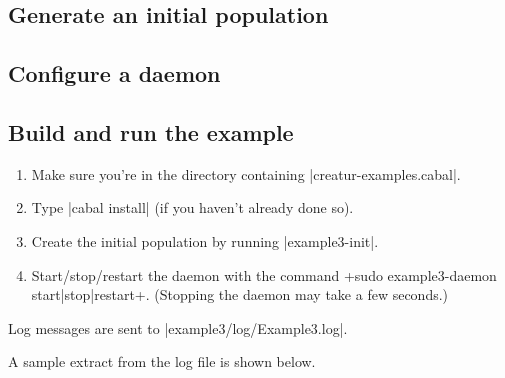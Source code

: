 \documentclass[a4paper,10pt]{report}
\begin{document}
\subsection{Generate an initial population}
\label{sec:pop3}



\subsection{Configure a daemon}
\label{sec:daemon3}



\subsection{Build and run the example}
\label{sec:run3}

\begin{enumerate}
\item Make sure you're in the directory containing |creatur-examples.cabal|.
\item Type |cabal install| (if you haven't already done so).
\item Create the initial population by running |example3-init|.
\item Start/stop/restart the daemon with the command
\UndefineShortVerb{\|}
\DefineShortVerb{\+}
+sudo example3-daemon start|stop|restart+.
\UndefineShortVerb{\+}
\DefineShortVerb{\|}
(Stopping the daemon may take a few seconds.)
\end{enumerate}

Log messages are sent to |example3/log/Example3.log|.

A sample extract from the log file is shown below.
\end{document}
